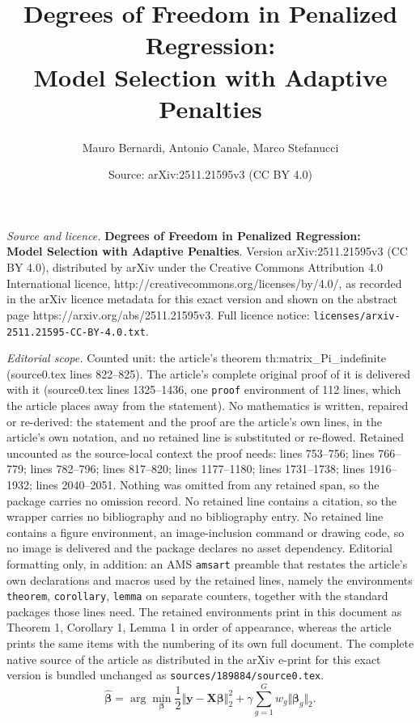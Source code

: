 \documentclass[10pt,a4paper]{amsart}
\title{\LARGE \textbf{Degrees of Freedom in Penalized Regression:\\ Model Selection with Adaptive Penalties}}
\author{Mauro Bernardi, Antonio Canale, Marco Stefanucci}
\date{Source: arXiv:2511.21595v3 (CC BY 4.0)}
\def\bX{\mathbf{X}}
\def\bbeta{\boldsymbol{\beta}}
\def\by{\boldsymbol{y}}
\begin{document}
\maketitle

\noindent\emph{Source and licence.} \LARGE \textbf{Degrees of Freedom in Penalized Regression:\\ Model Selection with Adaptive Penalties}. Version arXiv:2511.21595v3 (CC BY 4.0), distributed by arXiv under the Creative Commons Attribution 4.0 International licence, http://creativecommons.org/licenses/by/4.0/, as recorded in the arXiv licence metadata for this exact version and shown on the abstract page https://arxiv.org/abs/2511.21595v3. Full licence notice: \texttt{licenses/arxiv-2511.21595-CC-BY-4.0.txt}.\par\smallskip

\noindent\textit{Editorial scope.} Counted unit: the article's theorem th:matrix\_Pi\_indefinite (source0.tex lines 822--825). The article's complete original proof of it is delivered with it (source0.tex lines 1325--1436, one \texttt{proof} environment of 112 lines, which the article places away from the statement). No mathematics is written, repaired or re-derived: the statement and the proof are the article's own lines, in the article's own notation, and no retained line is substituted or re-flowed.  Retained uncounted as the source-local context the proof needs: lines 753--756; lines 766--779; lines 782--796; lines 817--820; lines 1177--1180; lines 1731--1738; lines 1916--1932; lines 2040--2051.  Nothing was omitted from any retained span, so the package carries no omission record.  No retained line contains a citation, so the wrapper carries no bibliography and no bibliography entry.  No retained line contains a figure environment, an image-inclusion command or drawing code, so no image is delivered and the package declares no asset dependency.  Editorial formatting only, in addition: an AMS \texttt{amsart} preamble that restates the article's own declarations and macros used by the retained lines, namely the environments \texttt{theorem}, \texttt{corollary}, \texttt{lemma} on separate counters, together with the standard packages those lines need.  The retained environments print in this document as Theorem 1, Corollary 1, Lemma 1 in order of appearance, whereas the article prints the same items with the numbering of its own full document.  The complete native source of the article as distributed in the arXiv e-print for this exact version is bundled unchanged as \texttt{sources/189884/source0.tex}.
\begin{equation}
\label{eq:convex_regularized_problem_glasso}
\widehat{\boldsymbol{\beta}}=\arg\min_{\bbeta} \frac{1}{2}\Vert\by-\bX \bbeta \Vert_2^2+\gamma \sum_{g=1}^Gw_g\Vert \bbeta_g\Vert_2.
\end{equation}
\end{document}
